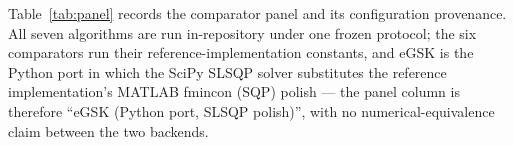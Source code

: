 \begingroup
\let\phviiiTableB\table
\let\phviiiEndTableB\endtable
\renewenvironment{table}[1][t]{\phviiiTableB[H]}{\phviiiEndTableB}

\endgroup

Table~\ref{tab:panel} records the comparator panel and its
configuration provenance.
All seven algorithms are run in-repository under one frozen protocol;
the six comparators run their reference-implementation constants, and eGSK
is the Python port in which the SciPy SLSQP solver substitutes the
reference implementation's MATLAB fmincon (SQP) polish --- the panel column is
therefore ``eGSK (Python port, SLSQP polish)'', with no
numerical-equivalence claim between the two
backends. %

